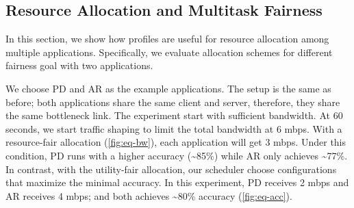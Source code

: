 \subsection{Resource Allocation and Multitask Fairness}
\label{sec:multi-task-alloc}

In this section, we show how profiles are useful for resource allocation among
multiple applications. Specifically, we evaluate allocation schemes for
different fairness goal with two applications.

We choose PD and AR as the example applications. The setup is the same as
before; both applications share the same client and server, therefore, they
share the same bottleneck link. The experiment start with sufficient
bandwidth. At 60 seconds, we start traffic shaping to limit the total bandwidth
at 6 mbps. With a resource-fair allocation (\autoref{fig:eq-bw}), each
application will get 3 mbps. Under this condition, PD runs with a higher
accuracy (\textasciitilde 85\%) while AR only achieves \textasciitilde 77\%. In
contrast, with the utility-fair allocation, our scheduler choose configurations
that maximize the minimal accuracy. In this experiment, PD receives 2 mbps and
AR receives 4 mbps; and both achieves \textasciitilde 80\% accuracy
(\autoref{fig:eq-acc}).

